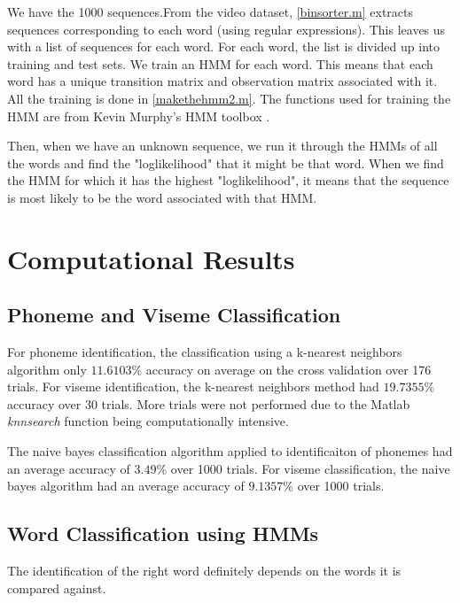 \documentclass[a4paper]{article}
\begin{document}
We have the 1000 sequences.From the video dataset, \ref{binsorter.m} extracts sequences corresponding to each word (using regular expressions).
This leaves us with a list of sequences for each word. For each word, the list is divided up into training and test sets. We train an HMM for each word. This means that each word has a unique transition matrix and observation matrix associated with it. All the training is done in \ref{makethehmm2.m}. The functions used for training the HMM are from Kevin Murphy's HMM toolbox \cite{key-9}.

Then, when we have an unknown sequence, we run it through the HMMs of all the words and find the "loglikelihood" that it might be that word. When we find the HMM for which it has the highest "loglikelihood", it means that the sequence is most likely to be the word associated with that HMM.

\section{Computational Results}

\subsection{ Phoneme and Viseme Classification}
For phoneme identification, the classification using a k-nearest neighbors algorithm only $11.6103\%$ accuracy on average on the cross validation over 176 trials.  For viseme identification, the k-nearest neighbors method had $19.7355\%$ accuracy over 30 trials.  More trials were not performed due to the Matlab {\it knnsearch} function being computationally intensive.  

The naive bayes classification algorithm applied to identificaiton of phonemes had an average accuracy of $3.49\%$ over 1000 trials.  For viseme classification, the naive bayes algorithm had an average accuracy of $9.1357\%$ over 1000 trials. 

\subsection{Word Classification using HMMs}

The identification of the right word definitely depends on the words it is compared against.
\end{document}

